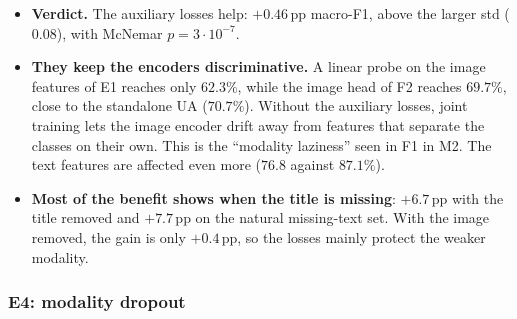 \begin{table}[H]
  \centering\small
  \caption{E1. ``Image head'' and ``text head'' are the accuracies of the auxiliary heads. Without the auxiliary
  losses they are linear probes on the detached features.}
  \label{tab:e1}
\end{table}

\begin{itemize}
  \item \textbf{Verdict.} The auxiliary losses help: $+0.46$\,pp macro-F1, above the larger std ($0.08$), with
        McNemar $p=3\cdot10^{-7}$.
  \item \textbf{They keep the encoders discriminative.} A linear probe on the image features of E1 reaches only
        $62.3\%$, while the image head of F2 reaches $69.7\%$, close to the standalone UA ($70.7\%$). Without the
        auxiliary losses, joint training lets the image encoder drift away from features that separate the
        classes on their own. This is the ``modality laziness'' seen in F1 in M2. The text features are affected
        even more ($76.8$ against $87.1\%$).
  \item \textbf{Most of the benefit shows when the title is missing}: $+6.7$\,pp with the title removed and $+7.7$\,pp
        on the natural missing-text set. With the image removed, the gain is only $+0.4$\,pp, so the losses
        mainly protect the weaker modality.
\end{itemize}

\subsubsection{E4: modality dropout}

